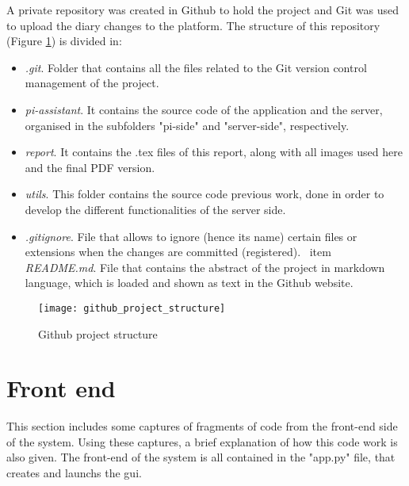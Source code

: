 	A private repository was created in Github to hold the project and Git was used to upload the diary changes to the platform. The structure of this repository (Figure \ref{fig:github_project_structure}) is divided in:

	\begin{itemize}
		\item \textit{.git}. Folder that contains all the files related to the Git version control management of the project.
		\item \textit{pi-assistant}. It contains the source code of the application and the server, organised in the subfolders "pi-side" and "server-side", respectively.
		\item \textit{report}. It contains the .tex files of this report, along with all images used here and the final PDF version.
		\item \textit{utils}. This folder contains the source code previous work, done in order to develop the different functionalities of the server side. 
		\item \textit{.gitignore}. File that allows to ignore (hence its name) certain files or extensions when the changes are committed (registered).
		\ item \textit{README.md}. File that contains the abstract of the project in markdown language, which is loaded and shown as text in the Github website. 
	\end{itemize}

	\begin{figure}[!ht]
		\centering
		\texttt{[image: github\_project\_structure]}
		\caption{Github project structure}
		\label{fig:github_project_structure}
	\end{figure}



\section{Front end}
\label{sec:front_end}
This section includes some captures of fragments of code from the front-end side of the system. Using these captures, a brief explanation of how this code work is also given. The front-end of the system is all contained in the "app.py" file, that creates and launchs the \gls{gui}.


